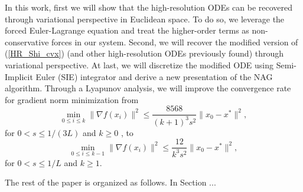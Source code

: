 \documentclass{article}
\theoremstyle{plain}
\theoremstyle{definition}
\theoremstyle{remark}
\begin{document}
\begin{center}
\end{center}

In this work, first we will show that the high-resolution ODEs can be recovered through variational perspective in Euclidean space. To do so, we leverage the forced Euler-Lagrange equation and treat the higher-order terms as non-conservative forces in our system.
 Second, we will recover the modified version of (\ref{HR_Shi_cvx}) (and other high-resolution ODEs previously found) through variational perspective. At last, we will discretize the modified ODE using Semi-Implicit Euler (SIE) integrator and derive a new presentation of the NAG algorithm. Through a Lyapunov analysis, we will improve the convergence rate for gradient norm minimization from
$$ \min_{0\leq i\leq k}\|\nabla f(x_i)\|^2 \leq \frac{8568}{(k+1)^3s^2}\|x_0-x^*\|^2,$$
 for $0< s\leq 1/(3L)$ and $k\geq0$ \cite{Shi2021UnderstandingTA}, to 
 $$   \min_{0\leq i\leq k-1}\|\nabla f(x_i)\|^2 \leq \frac{12}{k^3s^2}\|x_0-x^*\|^2,$$
for $0< s\leq 1/L$ and $k\geq 1$.\par
The rest of the paper is organized as follows. In Section ...
\end{document}
